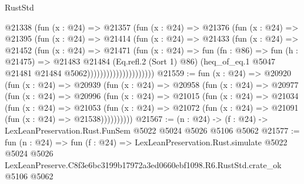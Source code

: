 \begin{lexlean}{RustStd}
\begin{coremodule}
                          @21338
                            (fun (x : @24) =>
                            @21357
                              (fun (x : @24) =>
                              @21376
                                (fun (x : @24) =>
                                @21395
                                  (fun (x : @24) =>
                                  @21414
                                    (fun (x : @24) =>
                                    @21433
                                      (fun (x : @24) =>
                                      @21452
                                        (fun (x : @24) =>
                                        @21471
                                          (fun (x : @24) =>
                                          fun (fn : @86) =>
                                          fun (h : @21475) =>
                                          @21483
                                            @21484
                                            (Eq.refl.{2} (Sort 1) @86)
                                            (heq_of_eq.{1}
                                              @5047
                                              @21481
                                              @21484
                                              @5062)))))))))))))))))))))
@21559 := fun (x : @24) =>
  @20920
    (fun (x : @24) =>
    @20939
      (fun (x : @24) =>
      @20958
        (fun (x : @24) =>
        @20977
          (fun (x : @24) =>
          @20996
            (fun (x : @24) =>
            @21015
              (fun (x : @24) =>
              @21034
                (fun (x : @24) =>
                @21053
                  (fun (x : @24) =>
                  @21072 (fun (x : @24) => @21091 (fun (x : @24) => @21538))))))))))
@21567 := (n : @24) -> (f : @24) -> LexLeanPreservation.Rust.FunSem @5022 @5024 @5026 @5106 @5062
@21577 := fun (n : @24) =>
  fun (f : @24) =>
  LexLeanPreservation.Rust.simulate
    @5022
    @5024
    @5026
    LexLeanPreserve.C8f3e6bc3199b17972a3ed0660ebf1098.R6.RustStd.crate_ok
    @5106
    @5062
\end{coremodule}
\end{lexlean}

